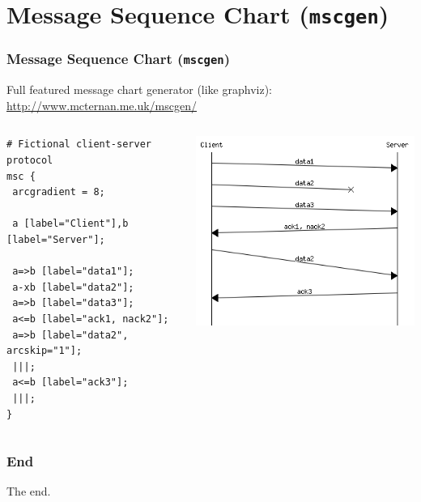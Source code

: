 \documentclass[pdf]{beamer}
\newcommand{\mono}[1]{\texttt{#1}}
\begin{document}
\section{Message Sequence Chart (\mono{mscgen})}
\begin{frame}[fragile] %
  \frametitle{Message Sequence Chart (\mono{mscgen})}
  Full featured message chart generator (like graphviz): \url{http://www.mcternan.me.uk/mscgen/}\\
  
  \begin{columns}
    \begin{column}{0.6\textwidth}
      \begin{center}
      \begin{lstlisting}
# Fictional client-server protocol
msc {
 arcgradient = 8;

 a [label="Client"],b [label="Server"];

 a=>b [label="data1"];
 a-xb [label="data2"];
 a=>b [label="data3"];
 a<=b [label="ack1, nack2"];
 a=>b [label="data2", arcskip="1"];
 |||;
 a<=b [label="ack3"];
 |||;
}
      \end{lstlisting}
    \end{center}
    \end{column}
    
    \begin{column}{0.4\textwidth}  %
        \begin{center}
          \includegraphics[scale=0.4]{data/mcsgen-example.png}
        \end{center}
    \end{column}
    \end{columns}
\end{frame}














\begin{frame}
  \frametitle{End}
  The end.
\end{frame}
\end{document}
